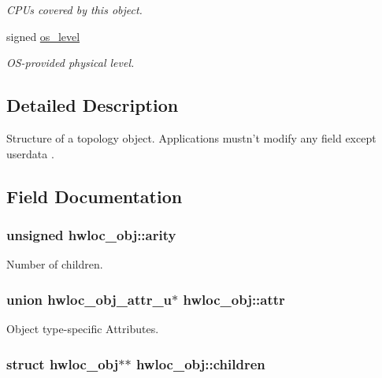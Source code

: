 \begin{DoxyCompactItemize}
$$\begin{DoxyCompactList}\small\item\em CPUs covered by this object. \item\end{DoxyCompactList}\item 
signed \hyperlink{structhwloc__obj_a68766f0b1c4d61b5bad87e3b81dacfde}{os\_\-level}
\begin{DoxyCompactList}\small\item\em OS-\/provided physical level. \item\end{DoxyCompactList}\end{DoxyCompactItemize}


\subsection{Detailed Description}
Structure of a topology object. Applications mustn't modify any field except userdata . 

\subsection{Field Documentation}
\hypertarget{structhwloc__obj_aac3f6da35c9b57599909a44ce2b716c1}{
\subsubsection[{arity}]{\setlength{\rightskip}{0pt plus 5cm}unsigned {\bf hwloc\_\-obj::arity}}}
\label{structhwloc__obj_aac3f6da35c9b57599909a44ce2b716c1}


Number of children. \hypertarget{structhwloc__obj_accd40e29f71f19e88db62ea3df02adc8}{
\subsubsection[{attr}]{\setlength{\rightskip}{0pt plus 5cm}union {\bf hwloc\_\-obj\_\-attr\_\-u}$\ast$ {\bf hwloc\_\-obj::attr}}}
\label{structhwloc__obj_accd40e29f71f19e88db62ea3df02adc8}


Object type-\/specific Attributes. \hypertarget{structhwloc__obj_a04d05403da37bfe17cd63b7c7dd07b1f}{
\subsubsection[{children}]{\setlength{\rightskip}{0pt plus 5cm}struct {\bf hwloc\_\-obj}$\ast$$\ast$ {\bf hwloc\_\-obj::children}}}
\label{structhwloc__obj_a04d05403da37bfe17cd63b7c7dd07b1f}


